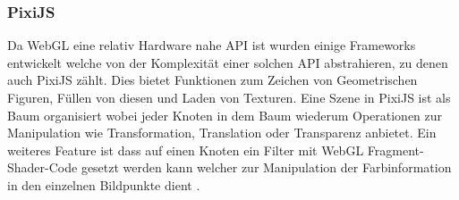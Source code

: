 \subsubsection{PixiJS}
\label{sec:PixiJS}
Da WebGL eine relativ Hardware nahe API ist wurden einige Frameworks entwickelt welche von der Komplexität einer solchen API abstrahieren, zu denen auch PixiJS zählt.
Dies bietet Funktionen zum Zeichen von Geometrischen Figuren, Füllen von diesen und Laden von Texturen.
Eine Szene in PixiJS ist als Baum organisiert wobei jeder Knoten in dem Baum wiederum Operationen zur Manipulation wie Transformation, Translation oder Transparenz anbietet.
Ein weiteres Feature ist dass auf einen Knoten ein Filter mit WebGL Fragment-Shader-Code gesetzt werden kann welcher zur Manipulation der Farbinformation in den einzelnen Bildpunkte dient \cite{pixijs}.


